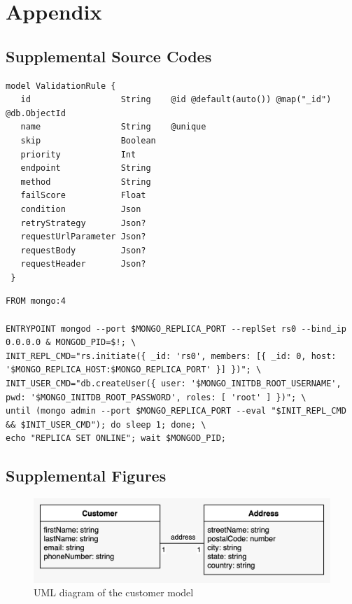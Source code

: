 \appendix
{}

\chapter{Appendix}

 \section{Supplemental Source Codes}
 
  \begin{lstlisting}[caption={\emph{Prisma} schema of a validation rule (Prisma)}, label={code:prisma}]
 model ValidationRule {
   id                  String    @id @default(auto()) @map("_id") @db.ObjectId
   name                String    @unique
   skip                Boolean
   priority            Int
   endpoint            String
   method              String
   failScore           Float
   condition           Json
   retryStrategy       Json?
   requestUrlParameter Json?
   requestBody         Json?
   requestHeader       Json?
 }
  \end{lstlisting}
  
  \begin{lstlisting}[caption={Dockerfile to run MongoDB as a replication set locally. Taken from Prisma GitHub repository (Docker)}, label={code:mongo}, language=docker]
FROM mongo:4

ENTRYPOINT mongod --port $MONGO_REPLICA_PORT --replSet rs0 --bind_ip 0.0.0.0 & MONGOD_PID=$!; \
INIT_REPL_CMD="rs.initiate({ _id: 'rs0', members: [{ _id: 0, host: '$MONGO_REPLICA_HOST:$MONGO_REPLICA_PORT' }] })"; \
INIT_USER_CMD="db.createUser({ user: '$MONGO_INITDB_ROOT_USERNAME', pwd: '$MONGO_INITDB_ROOT_PASSWORD', roles: [ 'root' ] })"; \
until (mongo admin --port $MONGO_REPLICA_PORT --eval "$INIT_REPL_CMD && $INIT_USER_CMD"); do sleep 1; done; \
echo "REPLICA SET ONLINE"; wait $MONGOD_PID;
  \end{lstlisting}

  \newpage
  \section{Supplemental Figures}

  \begin{figure}[!ht]
   \includegraphics[width=\textwidth]{diagrams/entity_customer.jpeg}
   \caption{UML diagram of the customer model}
   \label{fig:customer_uml}
  \end{figure}
  
